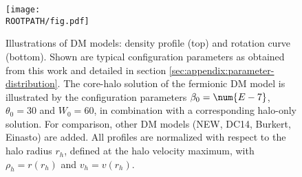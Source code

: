 \begin{figure}
	\centering%
	\texttt{[image: \\ROOTPATH/fig.pdf]}
	\caption{Illustrations of DM models: density profile (top) and rotation curve (bottom). Shown are typical configuration parameters as obtained from this work and detailed in section \ref{sec:appendix:parameter-distribution}. The core-halo solution of the fermionic DM model is illustrated by the configuration parameters $\beta_0 = \num{E-7}$, $\theta_0 = 30$ and $W_0 = 60$, in combination with a corresponding halo-only solution. For comparison, other DM models (NEW, DC14, Burkert, Einasto) are added. All profiles are normalized with respect to the halo radius $r_h$, defined at the halo velocity maximum, with $\rho_h = r(r_h)$ and $v_h = v(r_h)$.}%
	\label{fig:profile-illustration-mep}%
\end{figure}